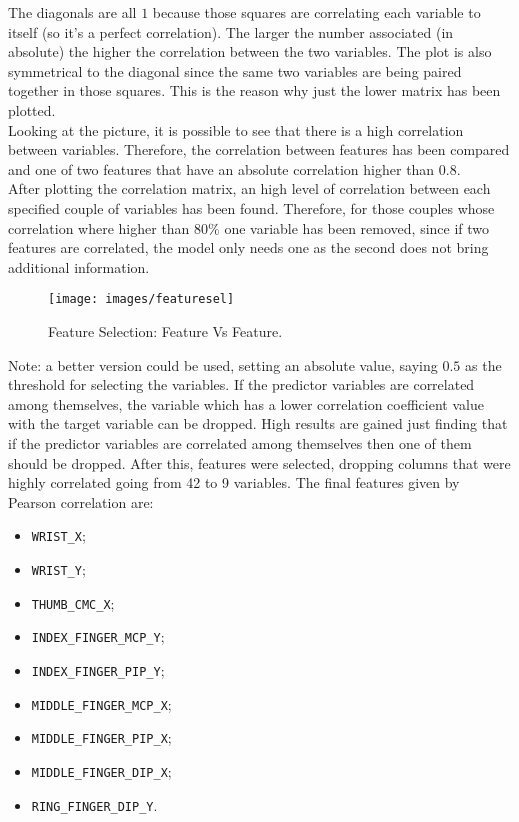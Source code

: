 \noindent The diagonals are all $1$ because those squares are correlating each variable to itself (so it's a perfect correlation). The larger the number associated (in absolute) the higher the correlation between the two variables. The plot is also symmetrical to the diagonal since the same two variables are being paired together in those squares. This is the reason why just the lower matrix has been plotted. \\

\noindent Looking at the picture, it is possible to see that there is a high correlation between variables. Therefore, the correlation between features has been compared and one of two features that have an absolute correlation higher than $0.8$. \\

\noindent After plotting the correlation matrix, an high level of correlation between each specified couple of variables has been found. Therefore, for those couples whose correlation where higher than $80\%$ one variable has been removed, since if two features are correlated, the model only needs one as the second does not bring additional information.  \\

\begin{figure}[H]
	\centering
	\texttt{[image: images/featuresel]}
	\caption[Feature Selection: Feature Vs Feature.]{Feature Selection: Feature Vs Feature.}
	\label{fig:featuresel}
\end{figure}

\noindent Note: a better version could be used, setting an absolute value, saying $0.5$ as the threshold for selecting the variables. If the predictor variables are correlated among themselves, the variable which has a lower correlation coefficient value with the target variable can be dropped. High results are gained just finding that if the predictor variables are correlated among themselves then one of them should be dropped. After this, features were selected, dropping columns that were highly correlated going from 42 to 9 variables. The final features given by Pearson correlation are: 

\begin{itemize}
	\item \texttt{WRIST\_X};
	\item \texttt{WRIST\_Y};
	\item \texttt{THUMB\_CMC\_X};
	\item \texttt{INDEX\_FINGER\_MCP\_Y};
	\item \texttt{INDEX\_FINGER\_PIP\_Y};
	\item \texttt{MIDDLE\_FINGER\_MCP\_X};
	\item \texttt{MIDDLE\_FINGER\_PIP\_X};
	\item \texttt{MIDDLE\_FINGER\_DIP\_X};
	\item \texttt{RING\_FINGER\_DIP\_Y}.
\end{itemize}

